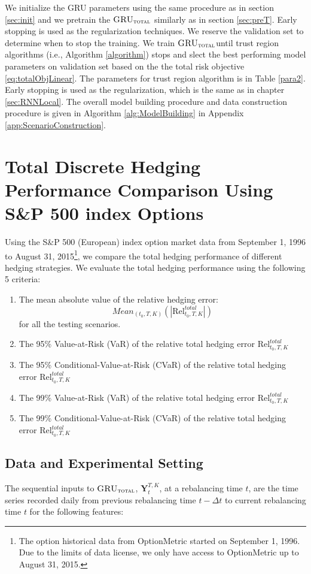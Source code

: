 \documentclass[letterpaper,12pt,titlepage,oneside,final]{book}
\numberwithin{equation}{section}
\theoremstyle{definition}
\newcommand{\modelT}{\textsc{GRU}_{\textsc{total}}}
\newcommand{\DT}{\Delta t}
\begin{document}
We  initialize the  GRU parameters using the same procedure as in section \ref{sec:init} and we pretrain the $\modelT$ similarly as in section \ref{sec:preT}. Early stopping is used as the regularization techniques. We reserve the validation set to determine when to stop the training. 
We train $\modelT$until trust region algorithms (i.e., Algorithm \ref{algorithm}) stops and slect the best performing model parameters on validation set based on  the the total risk objective \eqref{eq:totalObjLinear}. The  parameters for trust region algorithm is in Table \ref{para2}. Early stopping is used as the regularization, which is the same as in chapter \ref{sec:RNNLocal}. The overall model building procedure and data construction procedure is given in Algorithm \ref{alg:ModelBuilding} in Appendix \ref{app:ScenarioConstruction}.
\section{Total Discrete Hedging Performance Comparison Using  S\&P 500 index Options} \label{sec:totalcriteria}
Using the S\&P 500  ({European})  index option market data from September 1, 1996 to August 31, 2015\footnote{The option historical data from OptionMetric \cite{optionmetrics2008ivy} started on September 1, 1996. Due to the limits of data license, we only have access to OptionMetric up to  August 31, 2015.},
we  compare the total hedging performance of different hedging strategies.
We evaluate the total hedging performance using the following 5 criteria:
\begin{enumerate}
	\item The mean absolute value of the relative hedging error:
	\[
	Mean_{(t_0,T,K)}\left(\left|\text{Rel}^{total}_{t_0,T,K}\right|\right)
	\] for all the testing scenarios.
	\item The 95\% Value-at-Risk (VaR) of the relative total hedging error $\text{Rel}^{total}_{t_0,T,K}$
	\item The 95\% Conditional-Value-at-Risk (CVaR) of the relative total hedging error $\text{Rel}^{total}_{t_0,T,K}$
	\item The 99\% Value-at-Risk (VaR) of the relative total hedging error $\text{Rel}^{total}_{t_0,T,K}$
	\item The 99\% Conditional-Value-at-Risk (CVaR) of the relative total hedging error $\text{Rel}^{total}_{t_0,T,K}$
\end{enumerate}


\subsection{Data and Experimental Setting}
The sequential inputs to $\modelT$, $\mathbf{Y}_{t}^{T,K}$, at a rebalancing time $t$, are the  time series recorded daily from previous rebalancing time $t-\DT$ to current rebalancing time $t$ for the following features:
\end{document}
